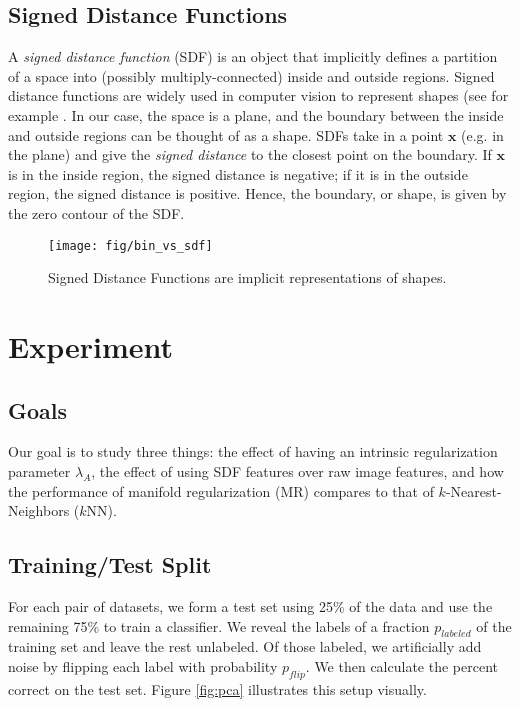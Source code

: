 \documentclass[anon,11pt]{9520} %
\newcommand{\mb}{\mathbf}
\begin{document}
\subsection{Signed Distance Functions} 
A {\em signed distance function} (SDF) is an object that implicitly defines a
partition of a space into (possibly multiply-connected) inside and outside
regions. Signed distance functions are widely used in computer vision to
represent shapes (see for example \cite{sdf}\cite{Tsai1}\cite{Tsai2}. In our case, the space is a plane,
and the boundary between the inside and outside regions can be thought of as a
shape. SDFs take in a point $\mb{x}$ (e.g. in the plane) and give the {\em
  signed distance} to the closest point on the boundary. If $\mb{x}$ is in the
inside region, the signed distance is negative; if it is in the outside region,
the signed distance is positive. Hence, the boundary, or shape, is given by the
zero contour of the SDF.
\begin{figure}[h!]
\begin{center}
\texttt{[image: fig/bin\_vs\_sdf]}
\end{center}
\caption{\label{fig:bin_vs_sdf} Signed Distance Functions are implicit representations of shapes.}
\end{figure}

\section{Experiment}
\subsection{Goals}
\label{sec:goals}
Our goal is to study three things: the effect of having an intrinsic
regularization parameter $\lambda_A$, the effect of using SDF features over raw
image features, and how the performance of manifold regularization (MR) compares
to that of $k$-Nearest-Neighbors ($k$NN).

\subsection{Training/Test Split}
For each pair of datasets, we form a test set using 25\% of the data and use the
remaining 75\% to train a classifier. We reveal the labels of a fraction
$p_{labeled}$ of the training set and leave the rest unlabeled. Of those
labeled, we artificially add noise by flipping each label with probability
$p_{flip}$. We then calculate the percent correct on the test set. Figure \ref{fig:pca} illustrates this setup visually.
\end{document}

